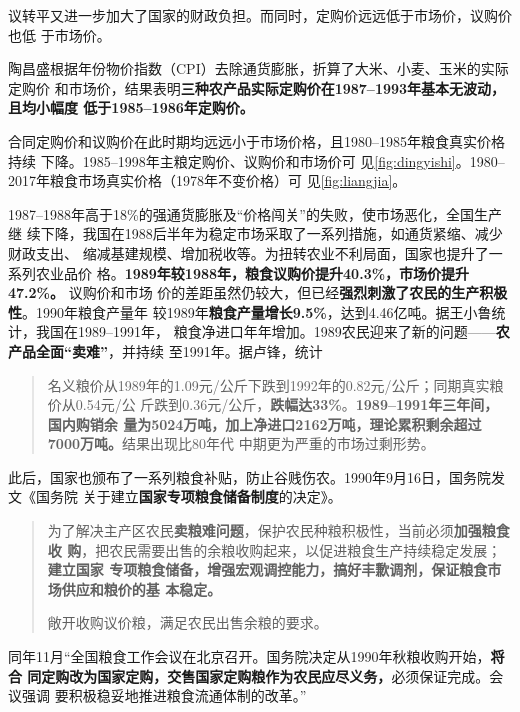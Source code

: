 议转平又进一步加大了国家的财政负担。而同时，定购价远远低于市场价，议购价也低
于市场价。

陶昌盛根据年份物价指数（CPI）去除通货膨胀，折算了大米、小麦、玉米的实际定购价
和市场价，结果表明\textbf{三种农产品实际定购价在1987--1993年基本无波动，且均小幅度
  低于1985--1986年定购价。}\cite{taochangsheng}






合同定购价和议购价在此时期均远远小于市场价格，且1980--1985年粮食真实价格持续
下降。1985--1998年主粮定购价、议购价和市场价可
见\cref{fig:dingyishi}。1980--2017年粮食市场真实价格（1978年不变价格）可
见\cref{fig:liangjia}。

1987--1988年高于18\%的强通货膨胀及“价格闯关”的失败，使市场恶化，全国生产继
续下降，我国在1988后半年为稳定市场采取了一系列措施，如通货紧缩、减少财政支出、
缩减基建规模、增加税收等。为扭转农业不利局面，国家也提升了一系列农业品价
格。\textbf{1989年较1988年，粮食议购价提升40.3\%，市场价提升47.2\%。} 议购价和市场
价的差距虽然仍较大，但已经\textbf{强烈刺激了农民的生产积极性}。1990年粮食产量年
较1989年\textbf{粮食产量增长9.5\%}，达到4.46亿吨。据王小鲁统计，我国在1989--1991年，
粮食净进口年年增加。1989农民迎来了新的问题——\textbf{农产品全面“卖难”}，并持续
至1991年。据卢锋，统计
\begin{quotation}
  名义粮价从1989年的1.09元/公斤下跌到1992年的0.82元/公斤；同期真实粮价从0.54元/公
  斤跌到0.36元/公斤，\textbf{跌幅达33\%}。\textbf{1989--1991年三年间，国内购销余
    量为5024万吨，加上净进口2162万吨，理论累积剩余超过7000万吨。}结果出现比80年代
  中期更为严重的市场过剩形势。
\end{quotation}

此后，国家也颁布了一系列粮食补贴，防止谷贱伤农。1990年9月16日，国务院发文《国务院
关于建立\textbf{国家专项粮食储备制度}的决定》。
\begin{quotation}
  为了解决主产区农民\textbf{卖粮难问题}，保护农民种粮积极性，当前必须\textbf{加强粮食收
    购}，把农民需要出售的余粮收购起来，以促进粮食生产持续稳定发展；\textbf{建立国家
    专项粮食储备，增强宏观调控能力，搞好丰歉调剂，保证粮食市场供应和粮价的基
    本稳定。}

  敞开收购议价粮，满足农民出售余粮的要求。
\end{quotation}

同年11月“全国粮食工作会议在北京召开。国务院决定从1990年秋粮收购开始，\textbf{将合
  同定购改为国家定购，交售国家定购粮作为农民应尽义务，}必须保证完成。会议强调
要积极稳妥地推进粮食流通体制的改革。”

